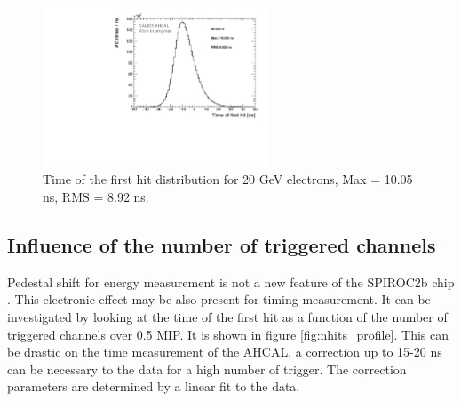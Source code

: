 \documentclass[twoside,a4paper,11pt]{article}
\begin{document}
\begin{figure}[htbp]
\begin{center}
\includegraphics[width=0.6\textwidth]{fig/Electrons/Timing_AllLayers_AfterMuons.pdf}
\caption{Time of the first hit distribution for 20 GeV electrons, Max = 10.05 ns, RMS = 8.92 ns.}
\label{fig:Timing_electrons}
\vspace{-6ex}
\end{center}
\end{figure}

\subsection{Influence of the number of triggered channels}
\label{subsec:ped_shift}

Pedestal shift for energy measurement is not a new feature of the SPIROC2b chip \cite{OskarMaster}. This electronic effect may be also present for timing measurement. It can be investigated by looking at the time of the first hit as a function of the number of triggered channels over 0.5 MIP. It is shown in figure \ref{fig:nhits_profile}. This can be drastic on the time measurement of the AHCAL, a correction up to 15-20 ns can be necessary to the data for a high number of trigger. The correction parameters are determined by a linear fit to the data.
\end{document}
